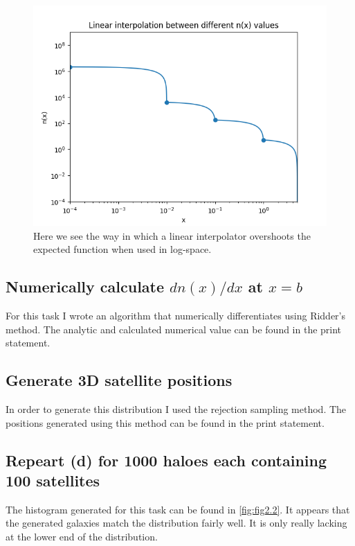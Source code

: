 \documentclass[a4paper,10pt]{article}
\begin{document}
\begin{figure}[h!]
  \centering
  \includegraphics[width=0.9\linewidth]{./plots/2_b.png}
  \caption{Here we see the way in which a linear interpolator overshoots the expected function when used in log-space.}
  \label{fig:fig2.1}
\end{figure}

\subsection{Numerically calculate $dn(x)/dx$ at $x=b$}

For this task I wrote an algorithm that numerically differentiates using Ridder's method. The analytic and calculated numerical value can be found in the print statement.

\subsection{Generate 3D satellite positions}

In order to generate this distribution I used the rejection sampling method. The positions generated using this method can be found in the print statement. 

\subsection{Repeart (d) for 1000 haloes each containing 100 satellites} 

The histogram generated for this task can be found in \ref{fig:fig2.2}. It appears that the generated galaxies match the distribution fairly well. It is only really lacking at the lower end of the distribution. 
\end{document}
